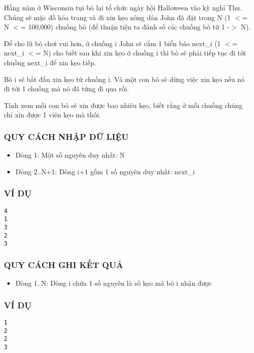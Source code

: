 



   Hằng năm ở Wisconsin tụi bò lại tổ chức ngày hội Halloween vào kỳ nghỉ Thu. Chúng sẽ mặc đồ hóa trang và đi xin kẹo nông dân John đã đặt trong  N (1 $<$= N $<$= 100,000) chuồng bò (để thuận tiện ta đánh số các chuồng  bò từ 1 -$>$ N).  

   Để cho lũ bò chơi vui hơn, ở chuồng i John sẽ cắm 1 biển báo next\_i  (1 $<$= next\_i $<$= N) cho biết sau khi xin kẹo ở chuồng i thì bò sẽ phải  tiếp tục đi tới chuồng next\_i để xin kẹo tiếp.  

   Bò i sẽ bắt đầu xin kẹo từ chuồng i. Và một con bò sẽ dừng việc xin kẹo nếu nó đi tới 1 chuồng mà nó đã từng đi qua rồi.  

   Tính xem mỗi con bò sẽ xin được bao nhiêu kẹo, biết rằng ở mỗi chuồng chúng chỉ xin được 1 viên kẹo mà thôi.  

\subsubsection{   QUY CÁCH NHẬP DỮ LIỆU  }
\begin{itemize}
	\item     Dòng 1: Một số nguyên duy nhất: N   
	\item     Dòng 2..N+1: Dòng i+1 gồm 1 số nguyên duy nhất: next\_i   
\end{itemize}

\subsubsection{   VÍ DỤ  }
\begin{verbatim}
4
1
3
2
3
\end{verbatim}

\subsubsection{   QUY CÁCH GHI KẾT QUẢ  }
\begin{itemize}
	\item     Dòng 1..N: Dòng i chứa 1 số nguyên là số kẹo mà bò i nhận được   
\end{itemize}

\subsubsection{   VÍ DỤ  }
\begin{verbatim}
1
2
2
3
\end{verbatim}